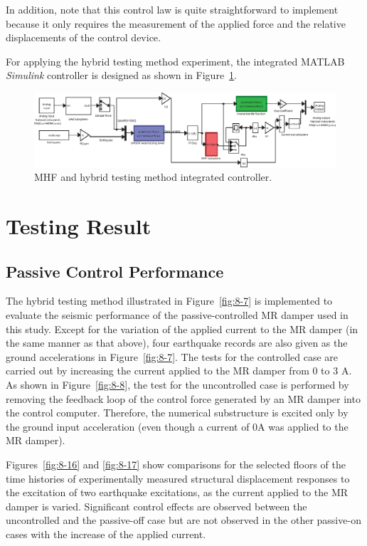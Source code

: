 In addition, note that this control law is quite straightforward to implement because it only requires the measurement of the applied force and the relative displacements of the control device.

For applying the hybrid testing method experiment, the integrated MATLAB \textit{Simulink} controller is designed as shown in Figure~\ref{fig:8-15}.

\begin{figure}[H]
\centering
\includegraphics[width=1\textwidth] {figure/8-15.eps}
\caption{MHF and hybrid testing method integrated controller.}
\label{fig:8-15}
\end{figure}

\section{Testing Result}
\subsection{Passive Control Performance}

The hybrid testing method illustrated in Figure~\ref{fig:8-7} is implemented to evaluate the seismic performance of the passive-controlled MR damper used in this study. Except for the variation of the applied current to the MR damper (in the same manner as that above), four earthquake records are also given as the ground accelerations in Figure~\ref{fig:8-7}. The tests for the controlled case are carried out by increasing the current applied to the MR damper from 0 to 3 A. As shown in Figure~\ref{fig:8-8}, the test for the uncontrolled case is performed by removing the feedback loop of the control force generated by an MR damper into the control computer. Therefore, the numerical substructure is excited only by the ground input acceleration (even though a current of 0A was applied to the MR damper).

Figures~\ref{fig:8-16} and \ref{fig:8-17} show comparisons for the selected floors of the time histories of experimentally measured structural displacement responses to the excitation of two earthquake excitations, as the current applied to the MR damper is varied. Significant control effects are observed between the uncontrolled and the passive-off case but are not observed in the other passive-on cases with the increase of the applied current.

